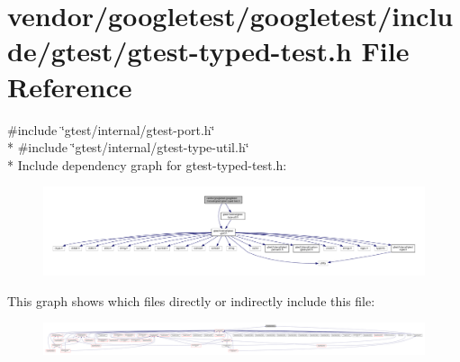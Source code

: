 \hypertarget{gtest-typed-test_8h}{}\section{vendor/googletest/googletest/include/gtest/gtest-\/typed-\/test.h File Reference}
\label{gtest-typed-test_8h}
{\ttfamily \#include \char`\"{}gtest/internal/gtest-\/port.\+h\char`\"{}}\\*
{\ttfamily \#include \char`\"{}gtest/internal/gtest-\/type-\/util.\+h\char`\"{}}\\*
Include dependency graph for gtest-\/typed-\/test.h\+:\nopagebreak
\begin{figure}[H]
\begin{center}
\leavevmode
\includegraphics[width=350pt]{gtest-typed-test_8h__incl}
\end{center}
\end{figure}
This graph shows which files directly or indirectly include this file\+:\nopagebreak
\begin{figure}[H]
\begin{center}
\leavevmode
\includegraphics[width=350pt]{gtest-typed-test_8h__dep__incl}
\end{center}
\end{figure}

